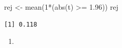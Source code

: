 \documentclass[
  letterpaper,
  DIV=11,
  numbers=noendperiod]{scrreprt}
\newenvironment{Shaded}{\begin{snugshade}}{\end{snugshade}}
\newcommand{\DecValTok}[1]{\textcolor[rgb]{0.68,0.00,0.00}{#1}}
\newcommand{\FloatTok}[1]{\textcolor[rgb]{0.68,0.00,0.00}{#1}}
\newcommand{\FunctionTok}[1]{\textcolor[rgb]{0.28,0.35,0.67}{#1}}
\newcommand{\NormalTok}[1]{\textcolor[rgb]{0.00,0.23,0.31}{#1}}
\newcommand{\OtherTok}[1]{\textcolor[rgb]{0.00,0.23,0.31}{#1}}
\newcommand{\SpecialCharTok}[1]{\textcolor[rgb]{0.37,0.37,0.37}{#1}}
\providecommand{\tightlist}{%
  \setlength{\itemsep}{0pt}\setlength{\parskip}{0pt}}\usepackage{longtable,booktabs,array}
\begin{document}
\begin{Shaded}
\begin{Highlighting}[]
\NormalTok{rej }\OtherTok{\textless{}{-}} \FunctionTok{mean}\NormalTok{(}\DecValTok{1}\SpecialCharTok{*}\NormalTok{(}\FunctionTok{abs}\NormalTok{(t) }\SpecialCharTok{\textgreater{}=} \FloatTok{1.96}\NormalTok{))}
\NormalTok{rej}
\end{Highlighting}
\end{Shaded}

\begin{verbatim}
[1] 0.118
\end{verbatim}

\begin{enumerate}
\def\labelenumi{\arabic{enumi}.}
\setcounter{enumi}{3}
\tightlist
\item
\end{enumerate}
\end{document}

